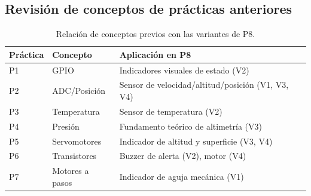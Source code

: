 \documentclass[11pt]{article}
\begin{document}
\subsection{Revisión de conceptos de prácticas anteriores}
\begin{table}[H]\centering
\caption{Relación de conceptos previos con las variantes de P8.}
\begin{tabular}{lll}
\toprule
Práctica & Concepto & Aplicación en P8 \\
\midrule
P1 & GPIO & Indicadores visuales de estado (V2) \\
P2 & ADC/Posición & Sensor de velocidad/altitud/posición (V1, V3, V4) \\
P3 & Temperatura & Sensor de temperatura (V2) \\
P4 & Presión & Fundamento teórico de altimetría (V3) \\
P5 & Servomotores & Indicador de altitud y superficie (V3, V4) \\
P6 & Transistores & Buzzer de alerta (V2), motor (V4) \\
P7 & Motores a pasos & Indicador de aguja mecánica (V1) \\
\bottomrule
\end{tabular}
\end{table}

\end{document}
